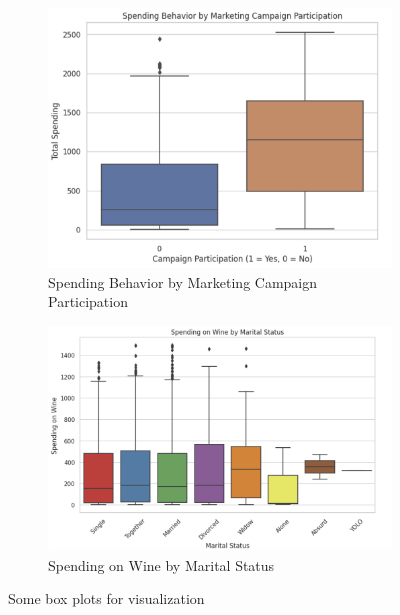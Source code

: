 \documentclass[a4paper]{article}
\begin{document}
\begin{figure}[h]
\begin{subfigure}{0.3\textwidth}
        \includegraphics[width=\linewidth]{Spending Behavior by Marketing Campaign Participation.png}
        \caption{Spending Behavior by Marketing Campaign Participation}
        \label{fig:sub5}
    \end{subfigure}
    \hfill
    \begin{subfigure}{0.3\textwidth}
        \includegraphics[width=\linewidth]{Spending on Wine by Marital Status.png}
        \caption{Spending on Wine by Marital Status}
        \label{fig:sub6}
    \end{subfigure}
    \caption{Some box plots for visualization}
    \label{fig:multi}
\end{figure}
\end{document}
